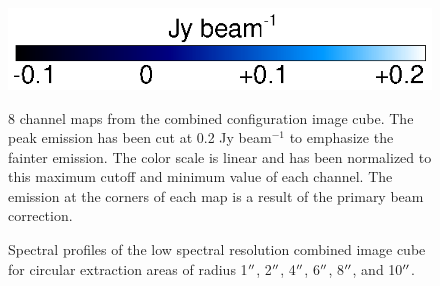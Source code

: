 \documentclass[preprint2]{aastex}
\begin{document}
\begin{figure}[hbt!]
{         }
\includegraphics[trim=0pt 20pt 180pt 10pt]{color_bar.ps}
\caption{8 channel maps from the combined configuration image cube. The peak emission has been cut at 0.2 Jy beam${{}^{-1}}$ to emphasize the fainter emission. The color scale is linear and has been normalized to this maximum cutoff and minimum value of each channel. The emission at the corners of each map is a result of the primary beam correction.}
\label{fig:fig3}
\end{figure}


\clearpage

\begin{figure}
\caption{Spectral profiles of the low spectral resolution combined image cube for circular extraction areas of radius 1$\mbox{$^{\prime\prime}$}$, 2$\mbox{$^{\prime\prime}$}$, 4$\mbox{$^{\prime\prime}$}$, 6$\mbox{$^{\prime\prime}$}$, 8$\mbox{$^{\prime\prime}$}$, and 10$\mbox{$^{\prime\prime}$}$.}
\label{fig:fig4}
\end{figure}

\clearpage
\end{document}
